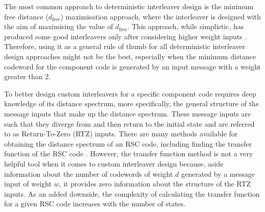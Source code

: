 The most common approach to deterministic interleaver design is the minimum free distance ($d_{\text{free}}$) maximisation approach, where the interleaver is designed with the aim of maximising the value of $d_{\text{free}}$. This approach, while simplistic, has produced some good interleavers only after considering higher weight inputs \cite{ref5}. Therefore,
using it as a general rule of thumb for all deterministic interleaver design approaches might not be the best, especially when the minimum distance codeword for the component code is generated by an input message with a weight greater than 2. 

To better design custom interleavers for a specific component code requires deep knowledge of its distance spectrum, more specifically, the general structure of the message inputs that make up the distance spectrum. These message inputs are such that they diverge from and then return to the initial state and are referred to as Return-To-Zero (RTZ) inputs.
There are many methods available for obtaining the distance spectrum of an RSC code, including finding the transfer function of the RSC code \cite{ref3}.
However, the transfer function method is not a very helpful tool when it comes to custom interleaver design because, aside information about the number of codewords of weight $d$ generated by a message input of weight $w$, it provides zero information about the structure of the RTZ inputs. As an added downside, the complexity of calculating the transfer function for a given RSC code increases with the number of states.




